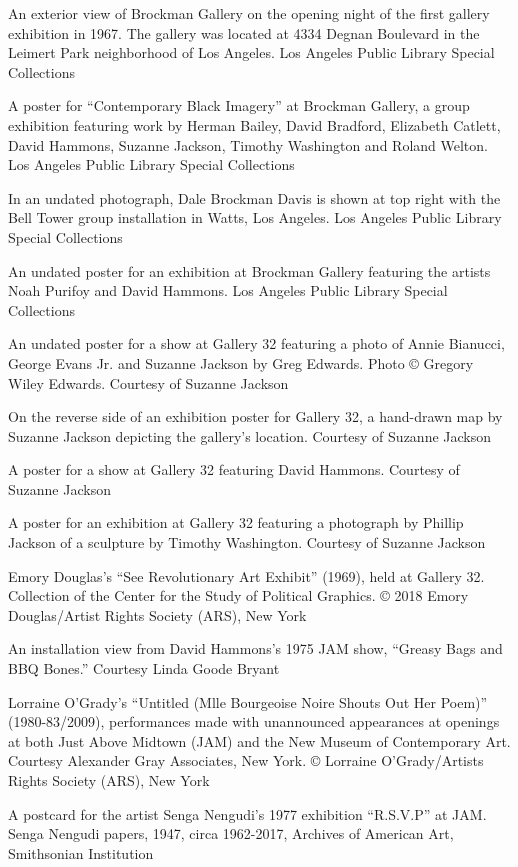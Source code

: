 An exterior view of Brockman Gallery on the opening night of the first
gallery exhibition in 1967. The gallery was located at 4334 Degnan
Boulevard in the Leimert Park neighborhood of Los Angeles. Los Angeles
Public Library Special Collections

A poster for ``Contemporary Black Imagery'' at Brockman Gallery, a group
exhibition featuring work by Herman Bailey, David Bradford, Elizabeth
Catlett, David Hammons, Suzanne Jackson, Timothy Washington and Roland
Welton. Los Angeles Public Library Special Collections

In an undated photograph, Dale Brockman Davis is shown at top right with
the Bell Tower group installation in Watts, Los Angeles. Los Angeles
Public Library Special Collections

An undated poster for an exhibition at Brockman Gallery featuring the
artists Noah Purifoy and David Hammons. Los Angeles Public Library
Special Collections

An undated poster for a show at Gallery 32 featuring a photo of Annie
Bianucci, George Evans Jr. and Suzanne Jackson by Greg Edwards. Photo ©
Gregory Wiley Edwards. Courtesy of Suzanne Jackson

On the reverse side of an exhibition poster for Gallery 32, a hand-drawn
map by Suzanne Jackson depicting the gallery's location. Courtesy of
Suzanne Jackson

A poster for a show at Gallery 32 featuring David Hammons. Courtesy of
Suzanne Jackson

A poster for an exhibition at Gallery 32 featuring a photograph by
Phillip Jackson of a sculpture by Timothy Washington. Courtesy of
Suzanne Jackson

Emory Douglas's ``See Revolutionary Art Exhibit'' (1969), held at
Gallery 32. Collection of the Center for the Study of Political
Graphics. © 2018 Emory Douglas/Artist Rights Society (ARS), New York

An installation view from David Hammons's 1975 JAM show, ``Greasy Bags
and BBQ Bones.'' Courtesy Linda Goode Bryant

Lorraine O'Grady's ``Untitled (Mlle Bourgeoise Noire Shouts Out Her
Poem)'' (1980-83/2009), performances made with unannounced appearances
at openings at both Just Above Midtown (JAM) and the New Museum of
Contemporary Art. Courtesy Alexander Gray Associates, New York. ©
Lorraine O'Grady/Artists Rights Society (ARS), New York

A postcard for the artist Senga Nengudi's 1977 exhibition ``R.S.V.P'' at
JAM. Senga Nengudi papers, 1947, circa 1962-2017, Archives of American
Art, Smithsonian Institution

